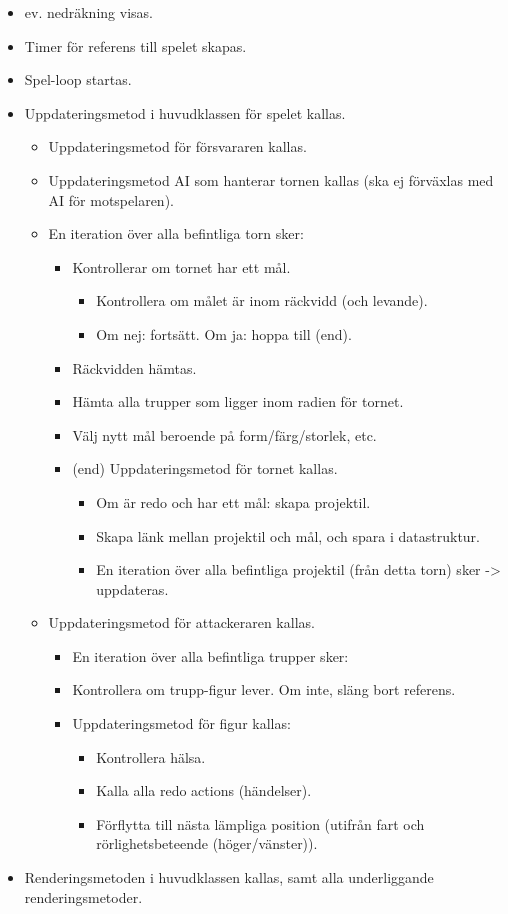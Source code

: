 \documentclass[10pt]{article}
\begin{document}
\begin{itemize}
		\item ev. nedräkning visas.
		\item Timer för referens till spelet skapas.
		\item Spel-loop startas.
		\item Uppdateringsmetod i huvudklassen för spelet kallas.
		\begin{itemize}
			\item Uppdateringsmetod för försvararen kallas.
			\item Uppdateringsmetod AI som hanterar tornen kallas (ska ej förväxlas med AI för motspelaren).
			\item En iteration över alla befintliga torn sker:
			\begin{itemize}
				\item Kontrollerar om tornet har ett mål.
				\begin{itemize}
					\item Kontrollera om målet är inom räckvidd (och levande).
					\item Om nej: fortsätt. Om ja: hoppa till (end).
				\end{itemize}
				\item Räckvidden hämtas.
				\item Hämta alla trupper som ligger inom radien för tornet.
				\item Välj nytt mål beroende på form/färg/storlek, etc.
				\item (end) Uppdateringsmetod för tornet kallas.
				\begin{itemize}
					\item Om är redo och har ett mål: skapa projektil.
					\item Skapa länk mellan projektil och mål, och spara i datastruktur.
					\item En iteration över alla befintliga projektil (från detta torn) sker -> uppdateras.
				\end{itemize}
			\end{itemize}
			\item Uppdateringsmetod för attackeraren kallas.
			\begin{itemize}
				\item En iteration över alla befintliga trupper sker:
				\item Kontrollera om trupp-figur lever. Om inte, släng bort referens.
				\item Uppdateringsmetod för figur kallas:
				\begin{itemize}
					\item Kontrollera hälsa.
					\item Kalla alla redo actions (händelser).
					\item Förflytta till nästa lämpliga position (utifrån fart och rörlighetsbeteende (höger/vänster)).
				\end{itemize}
			\end{itemize}
		\end{itemize}
		\item Renderingsmetoden i huvudklassen kallas, samt alla underliggande renderingsmetoder.
	\end{itemize}
\end{document}
